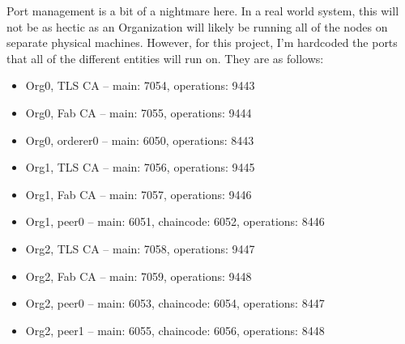 	\hspace{10mm}Port management is a bit of a nightmare here. In a real world system, this will not be as hectic as an Organization will likely be running all of the nodes on separate physical machines. However, for this project, I'm hardcoded the ports that all of the different entities will run on. They are as follows:
		\begin{itemize}
			\item Org0, TLS CA -- main: 7054, operations: 9443
			\item Org0, Fab CA -- main: 7055, operations: 9444
			\item Org0, orderer0 -- main: 6050, operations: 8443
			\item Org1, TLS CA -- main: 7056, operations: 9445
			\item Org1, Fab CA -- main: 7057, operations: 9446
			\item Org1, peer0 -- main: 6051, chaincode: 6052, operations: 8446			
			\item Org2, TLS CA -- main: 7058, operations: 9447
			\item Org2, Fab CA -- main: 7059, operations: 9448
			\item Org2, peer0 -- main: 6053, chaincode: 6054, operations: 8447
			\item Org2, peer1 -- main: 6055, chaincode: 6056, operations: 8448
		\end{itemize}
